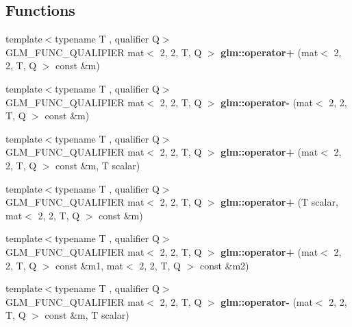 \subsection*{Functions}
\begin{DoxyCompactItemize}
\item 
\mbox{\label{type__mat2x2_8inl_ae58da6d122dbd410537502ee0a16f9cd}} 
{\footnotesize template$<$typename T , qualifier Q$>$ }\\G\+L\+M\+\_\+\+F\+U\+N\+C\+\_\+\+Q\+U\+A\+L\+I\+F\+I\+ER mat$<$ 2, 2, T, Q $>$ {\bfseries glm\+::operator+} (mat$<$ 2, 2, T, Q $>$ const \&m)
\item 
\mbox{\label{type__mat2x2_8inl_a44be44a2be57ea0295081bec73df8f71}} 
{\footnotesize template$<$typename T , qualifier Q$>$ }\\G\+L\+M\+\_\+\+F\+U\+N\+C\+\_\+\+Q\+U\+A\+L\+I\+F\+I\+ER mat$<$ 2, 2, T, Q $>$ {\bfseries glm\+::operator-\/} (mat$<$ 2, 2, T, Q $>$ const \&m)
\item 
\mbox{\label{type__mat2x2_8inl_a4985946dcd4a32193f3471a54a6bde94}} 
{\footnotesize template$<$typename T , qualifier Q$>$ }\\G\+L\+M\+\_\+\+F\+U\+N\+C\+\_\+\+Q\+U\+A\+L\+I\+F\+I\+ER mat$<$ 2, 2, T, Q $>$ {\bfseries glm\+::operator+} (mat$<$ 2, 2, T, Q $>$ const \&m, T scalar)
\item 
\mbox{\label{type__mat2x2_8inl_ae044e0d44472e5ce496c101a346995fa}} 
{\footnotesize template$<$typename T , qualifier Q$>$ }\\G\+L\+M\+\_\+\+F\+U\+N\+C\+\_\+\+Q\+U\+A\+L\+I\+F\+I\+ER mat$<$ 2, 2, T, Q $>$ {\bfseries glm\+::operator+} (T scalar, mat$<$ 2, 2, T, Q $>$ const \&m)
\item 
\mbox{\label{type__mat2x2_8inl_af64684c1a1aba33f75b3bb9e116df931}} 
{\footnotesize template$<$typename T , qualifier Q$>$ }\\G\+L\+M\+\_\+\+F\+U\+N\+C\+\_\+\+Q\+U\+A\+L\+I\+F\+I\+ER mat$<$ 2, 2, T, Q $>$ {\bfseries glm\+::operator+} (mat$<$ 2, 2, T, Q $>$ const \&m1, mat$<$ 2, 2, T, Q $>$ const \&m2)
\item 
\mbox{\label{type__mat2x2_8inl_a1377fda325537bf0f563c7bd829416ff}} 
{\footnotesize template$<$typename T , qualifier Q$>$ }\\G\+L\+M\+\_\+\+F\+U\+N\+C\+\_\+\+Q\+U\+A\+L\+I\+F\+I\+ER mat$<$ 2, 2, T, Q $>$ {\bfseries glm\+::operator-\/} (mat$<$ 2, 2, T, Q $>$ const \&m, T scalar)

\end{DoxyCompactItemize}
